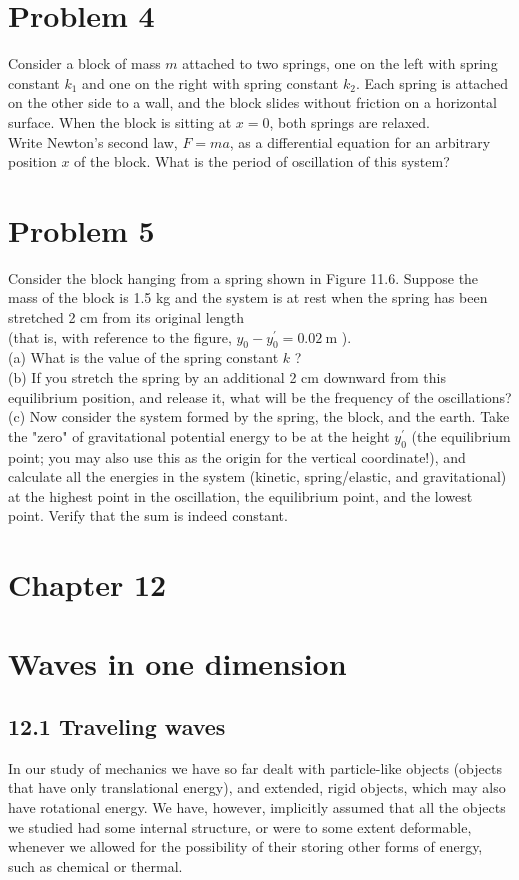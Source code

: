 \documentclass[10pt]{article}
\begin{document}
\section*{Problem 4}
Consider a block of mass $m$ attached to two springs, one on the left with spring constant $k_{1}$ and one on the right with spring constant $k_{2}$. Each spring is attached on the other side to a wall, and the block slides without friction on a horizontal surface. When the block is sitting at $x=0$, both springs are relaxed.\\
Write Newton's second law, $F=m a$, as a differential equation for an arbitrary position $x$ of the block. What is the period of oscillation of this system?

\section*{Problem 5}
Consider the block hanging from a spring shown in Figure 11.6. Suppose the mass of the block is 1.5 kg and the system is at rest when the spring has been stretched 2 cm from its original length\\
(that is, with reference to the figure, $y_{0}-y_{0}^{\prime}=0.02 \mathrm{~m}$ ).\\
(a) What is the value of the spring constant $k$ ?\\
(b) If you stretch the spring by an additional 2 cm downward from this equilibrium position, and release it, what will be the frequency of the oscillations?\\
(c) Now consider the system formed by the spring, the block, and the earth. Take the "zero" of gravitational potential energy to be at the height $y_{0}^{\prime}$ (the equilibrium point; you may also use this as the origin for the vertical coordinate!), and calculate all the energies in the system (kinetic, spring/elastic, and gravitational) at the highest point in the oscillation, the equilibrium point, and the lowest point. Verify that the sum is indeed constant.

\section*{Chapter 12}
\section*{Waves in one dimension}
\subsection*{12.1 Traveling waves}
In our study of mechanics we have so far dealt with particle-like objects (objects that have only translational energy), and extended, rigid objects, which may also have rotational energy. We have, however, implicitly assumed that all the objects we studied had some internal structure, or were to some extent deformable, whenever we allowed for the possibility of their storing other forms of energy, such as chemical or thermal.
\end{document}
